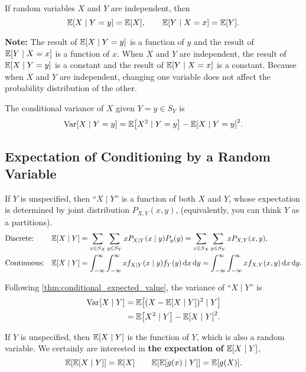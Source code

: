 \begin{theorem}
    If random variables $X$ and $Y$ are independent, then
    \[\E{X\mid Y=y}=\E{X}, \qquad \E{Y\mid X=x}=\E{Y}.\]
\end{theorem}
\textbf{Note:} The result of $\E{X\mid Y=y}$ is a function of $y$ and the result of $\E{Y\mid X=x}$ is a function of $x$. When $X$ and $Y$ are independent, the result of $\E{X\mid Y=y}$ is a constant and the result of $\E{Y\mid X=x}$ is a constant. Because when $X$ and $Y$ are independent, changing one variable does not affect the probability distribution of the other.

\begin{theorem}
    The conditional variance of $X$ given $Y=y\in S_Y$ is
    \[\Var[X\mid Y=y]=\E{X^2\mid Y=y}-\E{X\mid Y=y}^2.\]
\end{theorem}

\subsection{Expectation of Conditioning by a Random Variable}
\begin{theorem}\label{thm:conditional_expected_value}
    If $Y$ is unspecified, then ``$X\mid Y$'' is a function of both $X$ and $Y$, whose expectation is determined by joint distribution $P_{X,Y}(x,y)$, (equivalently, you can think $Y$ as a partitions).
    \begin{align*}
        &\text{Discrete:}& \E{X\mid Y}&=\sum_{x\in S_X}\sum_{y\in S_Y}xP_{X\mid Y}(x\mid y)P_y(y)=\sum_{x\in S_X}\sum_{y\in S_Y}xP_{X, Y}(x, y), \\
        &\text{Continuous:}& \E{X\mid Y}&=\int_{-\infty}^{\infty}\int_{-\infty}^{\infty}xf_{X\mid Y}(x\mid y)f_Y(y)\diff x\diff y=\int_{-\infty}^{\infty}\int_{-\infty}^{\infty}xf_{X, Y}(x, y)\diff x\diff y.
    \end{align*}
\end{theorem}

\begin{theorem}
    Following \cref{thm:conditional_expected_value}, the variance of ``$X\mid Y$'' is
    \begin{align*}
        \Var[X\mid Y]
        &= \E{(X-\E{X\mid Y})^2\mid Y} \\
        &= \E{X^2\mid Y}-\E{X\mid Y}^2 .
    \end{align*}
\end{theorem}

\begin{theorem}
    \label{thm:iterated_expectation}
    If $Y$ is unspecified, then $\E{X\mid Y}$ is the function of $Y$, which is also a random variable. We certainly are interested in \textbf{the expectation of} $\E{X\mid Y}$,
    \[\E{\E{X\mid Y}}=\E{X} \qquad \E{\E{g(x)\mid Y}}=\E{g(X)}.\]
\end{theorem}

